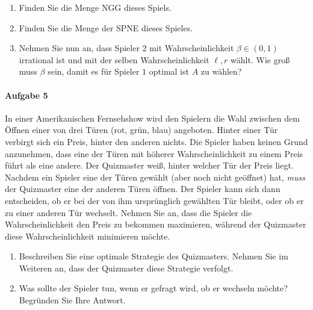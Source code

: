 \begin{enumerate}
  \item Finden Sie die Menge NGG dieses Spiels.
  \item Finden Sie die Menge der SPNE dieses Spieles.
  \item Nehmen Sie nun an, dass Spieler 2 mit Wahrscheinlichkeit $\beta \in (0,1)$
    irrational ist und mit der selben Wahrscheinlichkeit $\ell, r$ wählt.
    Wie groß muss $\beta$ sein, damit es für Spieler $1$ optimal ist $A$ zu wählen?
\end{enumerate}

\paragraph{Aufgabe 5}%
\label{par:aufgabe_5}

In einer Amerikanischen Fernsehshow wird den Spielern die Wahl zwischen dem Öffnen einer
von drei Türen (rot, grün, blau) angeboten.
Hinter einer Tür verbirgt sich ein Preis, hinter den anderen nichts.
Die Spieler haben keinen Grund anzunehmen, dass eine der Türen mit höherer
Wahrscheinlichkeit zu einem Preis führt als eine andere.
Der Quizmaster weiß, hinter welcher Tür der Preis liegt.
Nachdem ein Spieler eine der Türen gewählt (aber noch nicht geöffnet) hat, \emph{muss} der
Quizmaster eine der anderen Türen öffnen.
Der Spieler kann sich dann entscheiden, ob er bei der von ihm ursprünglich gewählten Tür
bleibt, oder ob er zu einer anderen Tür wechselt.
Nehmen Sie an, dass die Spieler die Wahrscheinlichkeit den Preis zu bekommen maximieren,
während der Quizmaster diese Wahrscheinlichkeit minimieren möchte.

\begin{enumerate}
  \item Beschreiben Sie eine optimale Strategie des Quizmasters.
    Nehmen Sie im Weiteren an, dass der Quizmaster diese Strategie verfolgt.

  \item Was sollte der Spieler tun, wenn er gefragt wird, ob er wechseln möchte?
    Begründen Sie Ihre Antwort.
\end{enumerate}
